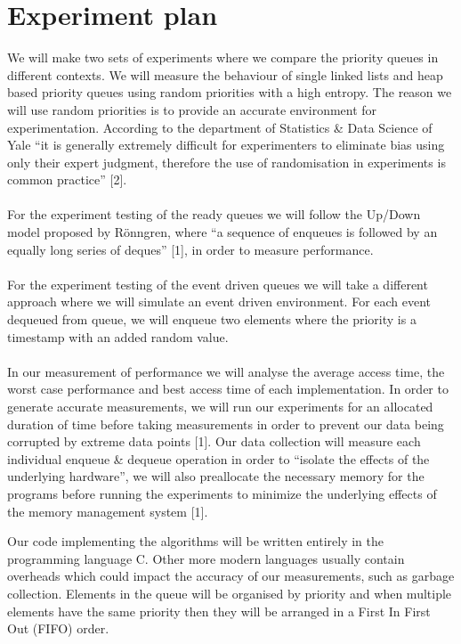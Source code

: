 \documentclass[12pt]{article}
\begin{document}
\section{Experiment plan}

We will make two sets of experiments where we compare the priority queues in different contexts. We will measure the behaviour of single linked lists and heap based priority queues using random priorities with a high entropy. The reason we will use random priorities is to provide an accurate environment for experimentation. According to the department of Statistics \& Data Science of Yale “it is generally extremely difficult for experimenters to eliminate bias using only their expert judgment, therefore the use of randomisation in experiments is common practice” [2]. 
\\
\\
For the experiment testing of the ready queues we will follow the Up/Down model proposed by Rönngren, where “a sequence of enqueues is followed by an equally long series of deques” [1], in order to measure performance. 
\\
\\
For the experiment testing of the event driven queues we will take a different approach where we will simulate an event driven environment. For each event dequeued from queue, we will enqueue two elements where the priority is a timestamp with an added random value.
\\
\\
In our measurement of performance we will analyse the average access time, the worst case performance and best access time of each implementation. In order to generate accurate measurements, we will run our experiments for an allocated duration of time before taking measurements in order to prevent our data being corrupted by extreme data points [1]. Our data collection will measure each individual enqueue \& dequeue operation in order to “isolate the effects of the underlying hardware”, we will also preallocate the necessary memory for the programs before running the experiments to minimize the underlying effects of the memory management system [1]. 


Our code implementing the algorithms will be written entirely in the programming language C. Other more modern languages usually contain overheads which could impact the accuracy of our measurements, such as garbage collection. Elements in the queue will be organised by priority and when multiple elements have the same priority then they will be arranged in a First In First Out (FIFO) order.
\end{document}
